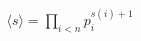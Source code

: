 \documentclass[preview]{standalone}
\begin{document}
\begin{align*}
\langle s \rangle = \prod_{i < n} p_i^{s(i)+1}
\end{align*}
\end{document}
